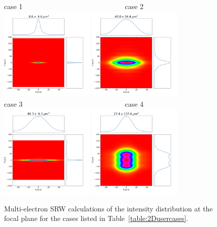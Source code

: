 \documentclass{iucr}              %
\begin{document}

\begin{figure}\label{fig:srw}
    \centering
    case 1~~~~~~~~~~~~~~~~~~~~~~~~~~~~~case 2\\
    \includegraphics[width=0.4\textwidth]{figures/case1_srw.png}
    \includegraphics[width=0.4\textwidth]{figures/case2_srw.png}\\
    case 3~~~~~~~~~~~~~~~~~~~~~~~~~~~~~case 4\\
    \includegraphics[width=0.4\textwidth]{figures/case3_srw.png}
    \includegraphics[width=0.4\textwidth]{figures/case4_srw.png}
    \caption{Multi-electron SRW calculations of the intensity distribution at the focal plane for the cases listed in Table~\ref{table:2Dusercases}.}
\end{figure}
\end{document}
